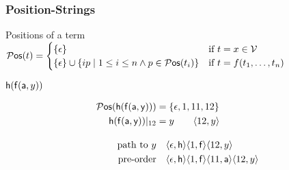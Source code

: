 
\begin{frame}
\frametitle{Position-Strings}
\begin{exampleblock}{Positions of a term}
$
	{}{\mathcal P}\mathsf{os}(t) =  
	\begin{cases}
		\{ \epsilon \} & \text{if }t=x\in{\mathcal V} \\
		\{ \epsilon \} \cup \{ ip\mid 1\leq i\leq n \land p\in{}{\mathcal P}\mathsf{os}(t_i)\} &
		\text{if }t=f(t_1,\ldots,t_n)
	\end{cases}
$
\end{exampleblock}

%

\begin{exampleblock}{${\mathsf h}({\mathsf f}({\mathsf a},y))$}
\begin{minipage}[c]{3.1cm}
\end{minipage}
%
\begin{minipage}[c]{8.5cm}
\begin{align*}
\Pos(\mh(\mf(\ma,\my))) &= \{ \epsilon, 1, 11, 12 \}
\\
\mh(\mf(\ma,\my))|_{12} &= y \tag*{$\ANGLES{12,y}$}
\\[1em]
\text{path to }y &\quad 
\ANGLES{\epsilon,\mh}\ANGLES{1,\mf}\ANGLES{12,y}
\\
\text{pre-order} &\quad
\ANGLES{\epsilon,\mh}\ANGLES{1,\mf}\ANGLES{11,\ma}\ANGLES{12,y}
\\
\end{align*}
%
\end{minipage}
\end{exampleblock}
\end{frame}
